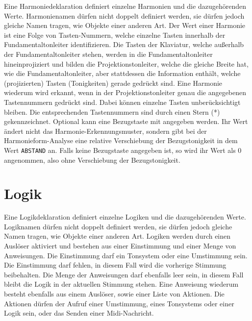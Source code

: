 Eine Harmoniedeklaration definiert einzelne Harmonien und die
dazugehörenden Werte. Harmonienamen dürfen nicht doppelt definiert
werden, sie dürfen jedoch gleiche Namen tragen,
wie Objekte einer anderen Art.
Der Wert einer Harmonie ist eine Folge von Tasten-Nummern,
welche einzelne Tasten innerhalb der Fundamentaltonleiter identifizieren.
Die Tasten der Klaviatur, welche außerhalb der Fundamentaltonleiter
stehen, werden in die Fundamentaltonleiter hineinprojiziert und
bilden die Projektionstonleiter,
welche die gleiche Breite
hat, wie die Fundamentaltonleiter, aber stattdessen die Information
enthält, welche (projizierten) Tasten (Tonigkeiten)
gerade gedrückt sind.
Eine Harmonie wiederum wird erkannt, wenn in der Projektionstonleiter genau
die angegebenen Tastennummern gedrückt sind. Dabei können einzelne
Tasten unberücksichtigt bleiben. Die entsprechenden Tastennummern sind
durch einen Stern (*)\index{*} gekennzeichnet.
Optional kann eine Bezugstaste
mit angegeben werden.
Ihr Wert ändert nicht das Harmonie-Erkennungsmuster, sondern gibt
bei der Harmonieform-Analyse eine relative Verschiebung
der Bezugstonigkeit
 in dem Wert \texttt{ABSTAND} an.
Falls keine Bezugstaste angegeben ist, so wird ihr Wert als $0$ angenommen,
also ohne Verschiebung der Bezugstonigkeit.





\chapter{Logik}\label{cha:logik}
Eine Logikdeklaration definiert einzelne Logiken und die
dazugehörenden Werte. Logiknamen dürfen nicht doppelt definiert
werden, sie dürfen jedoch gleiche Namen tragen,
wie Objekte einer anderen Art.
Logiken werden durch einen Auslöser aktiviert und
bestehen aus einer Einstimmung
 und einer Menge von Anweisungen.
Die Einstimmung darf ein Tonsystem oder eine Umstimmung sein.
Die Einstimmung darf fehlen, in diesem Fall wird die vorherige Stimmung
beibehalten. Die Menge der Anweisungen darf ebenfalls leer sein, in diesem
Fall bleibt die Logik in der aktuellen Stimmung stehen.
Eine Anweisung wiederum besteht ebenfalls aus einem Auslöser, sowie einer
Liste von Aktionen.
Die Aktionen dürfen der Aufruf einer Umstimmung, eines Tonsystems
oder einer Logik sein, oder das Senden einer Midi-Nachricht.

